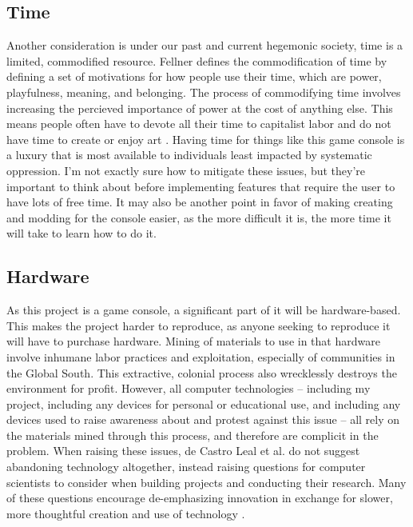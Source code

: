 \documentclass[10pt,twocolumn]{article}
\begin{document}
\subsection{Time}

Another consideration is under our past and current hegemonic society, time is a
limited, commodified resource. Fellner defines the commodification of time by
defining a set of motivations for how people use their time, which are power,
playfulness, meaning, and belonging. The process of commodifying time involves
increasing the percieved importance of power at the cost of anything else. This
means people often have to devote all their time to capitalist labor and do not
have time to create or enjoy art \cite{fellner_value_2017}. Having time for
things like this game console is a luxury that is most available to individuals
least impacted by systematic oppression. I'm not exactly sure how to mitigate
these issues, but they're important to think about before implementing features
that require the user to have lots of free time. It may also be another point in
favor of making creating and modding for the console easier, as the more
difficult it is, the more time it will take to learn how to do it.

\subsection{Hardware}

As this project is a game console, a significant part of it will be
hardware-based. This makes the project harder to reproduce, as anyone seeking to
reproduce it will have to purchase hardware. Mining of materials to use in that
hardware involve inhumane labor practices and exploitation, especially of
communities in the Global South. This extractive, colonial process also
wrecklessly destroys the environment for profit. However, all computer
technologies -- including my project, including any devices for personal or
educational use, and including any devices used to raise awareness about and
protest against this issue -- all rely on the materials mined through this
process, and therefore are complicit in the problem. When raising these issues,
de Castro Leal et al. do not suggest abandoning technology altogether, instead
raising questions for computer scientists to consider when building projects and
conducting their research. Many of these questions encourage de-emphasizing
innovation in exchange for slower, more thoughtful creation and use of
technology \cite{de_castro_leal_into_2021}.
\end{document}
